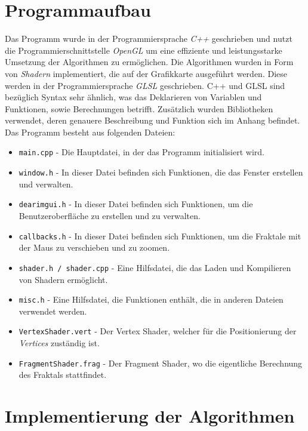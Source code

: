\section{Programmaufbau}
Das Programm wurde in der Programmiersprache \textit{C++} geschrieben und nutzt
die Programmierschnittstelle \textit{OpenGL} um eine effiziente und
leistungsstarke Umsetzung der Algorithmen zu ermöglichen. Die Algorithmen
wurden in Form von \textit{Shadern} implementiert, die auf der Grafikkarte
ausgeführt werden. Diese werden in der Programmiersprache \textit{GLSL}
geschrieben. \newline C++ und GLSL sind bezüglich Syntax sehr ähnlich, was das
Deklarieren von Variablen und Funktionen, sowie Berechnungen betrifft.\hfill
\break \newline \noindent Zusätzlich wurden Bibliotheken verwendet, deren
genauere Beschreibung und Funktion sich im Anhang befindet. \hfill \break
\newline \noindent Das Programm besteht aus folgenden Dateien:
\begin{itemize}
    \item \texttt{main.cpp} - Die Hauptdatei, in der das Programm initialisiert wird.
    \item \texttt{window.h} - In dieser Datei befinden sich Funktionen, die das Fenster erstellen und verwalten.
    \item \texttt{dearimgui.h} - In dieser Datei befinden sich Funktionen, um die Benutzeroberfläche zu erstellen und zu verwalten.
    \item \texttt{callbacks.h} - In dieser Datei befinden sich Funktionen, um die Fraktale mit der Maus zu verschieben und zu zoomen.
    \item \texttt{shader.h / shader.cpp} - Eine Hilfsdatei, die das Laden und Kompilieren von Shadern ermöglicht.
    \item \texttt{misc.h} - Eine Hilfsdatei, die Funktionen enthält, die in anderen Dateien verwendet werden.
    \item \texttt{VertexShader.vert} - Der Vertex Shader, welcher für die Positionierung der \textit{Vertices} zuständig ist.
    \item \texttt{FragmentShader.frag} - Der Fragment Shader, wo die eigentliche Berechnung des Fraktals stattfindet.
\end{itemize}

\section{Implementierung der Algorithmen}

\blindtext

